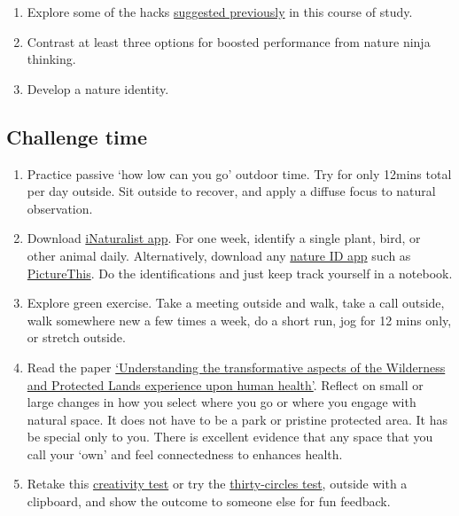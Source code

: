 \documentclass[
]{book}
\providecommand{\tightlist}{%
  \setlength{\itemsep}{0pt}\setlength{\parskip}{0pt}}
\begin{document}
\begin{enumerate}
\def\labelenumi{\arabic{enumi}.}
\tightlist
\item
  Explore some of the hacks \href{https://figshare.com/articles/presentation/Nature_hacks_for_life/16878808}{suggested previously} in this course of study.\\
\item
  Contrast at least three options for boosted performance from nature ninja thinking.\\
\item
  Develop a nature identity.
\end{enumerate}

\hypertarget{challenge-time-2}{%
\subsection*{Challenge time}\label{challenge-time-2}}

\begin{enumerate}
\def\labelenumi{\arabic{enumi}.}
\tightlist
\item
  Practice passive `how low can you go' outdoor time. Try for only 12mins total per day outside. Sit outside to recover, and apply a diffuse focus to natural observation.\\
\item
  Download \href{https://www.inaturalist.org}{iNaturalist app}. For one week, identify a single plant, bird, or other animal daily. Alternatively, download any \href{https://www.hortibiz.com/newsitem/news/9-best-plant-identification-app-choices-of-2020/}{nature ID app} such as \href{https://www.picturethisai.com}{PictureThis}. Do the identifications and just keep track yourself in a notebook.\\
\item
  Explore green exercise. Take a meeting outside and walk, take a call outside, walk somewhere new a few times a week, do a short run, jog for 12 mins only, or stretch outside.
\item
  Read the paper \href{https://www.fs.usda.gov/treesearch/pubs/38787}{`Understanding the transformative aspects of the Wilderness and Protected Lands experience upon human health'}. Reflect on small or large changes in how you select where you go or where you engage with natural space. It does not have to be a park or pristine protected area. It has be special only to you. There is excellent evidence that any space that you call your `own' and feel connectedness to enhances health.\\
\item
  Retake this \href{http://www.testmycreativity.com}{creativity test} or try the \href{https://www.ideo.com/blog/build-your-creative-confidence-thirty-circles-exercise}{thirty-circles test}, outside with a clipboard, and show the outcome to someone else for fun feedback.
\end{enumerate}
\end{document}
